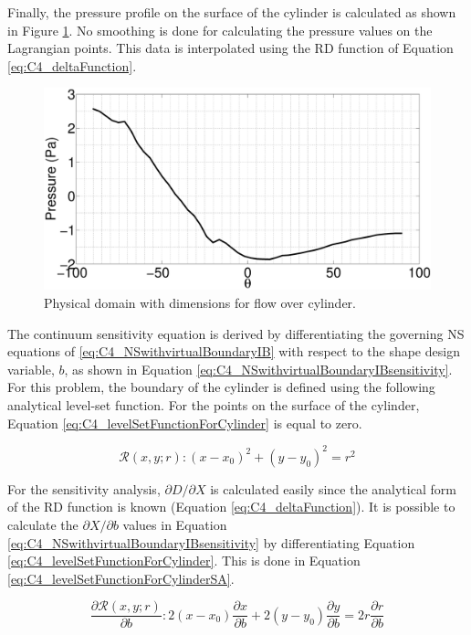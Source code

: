 Finally, the pressure profile on the surface of the cylinder is calculated as shown in Figure \ref{fig:C4_pressureOnSurfaceCylinder}. No smoothing is done for calculating the pressure values on the Lagrangian points. This data is interpolated using the RD function of Equation \eqref{eq:C4_deltaFunction}.

\begin{figure}[H]
    \centering
    \includegraphics[width=12.00cm]{Chapter_4/figure/flow_over_cylinder/p_on_boundary_RE100.eps}
    \caption{Physical domain with dimensions for flow over cylinder.}
    \label{fig:C4_pressureOnSurfaceCylinder}
\end{figure}

The continuum sensitivity equation is derived by differentiating the governing NS equations of \eqref{eq:C4_NSwithvirtualBoundaryIB} with respect to the shape design variable, $b$, as shown in Equation \eqref{eq:C4_NSwithvirtualBoundaryIBsensitivity}. For this problem, the boundary of the cylinder is defined using the following analytical level-set function. For the points on the surface of the cylinder, Equation \eqref{eq:C4_levelSetFunctionForCylinder} is equal to zero.

\begin{equation}\label{eq:C4_levelSetFunctionForCylinder}
	\mathcal{R}(x, y; r): (x - x_0)^2 + (y - y_0)^2 = r^2
\end{equation}

For the sensitivity analysis, $\partial D/\partial X$ is calculated easily since the analytical form of the RD function is known (Equation \eqref{eq:C4_deltaFunction}). It is possible to calculate the $\partial X/\partial b$ values in Equation \eqref{eq:C4_NSwithvirtualBoundaryIBsensitivity} by differentiating Equation \eqref{eq:C4_levelSetFunctionForCylinder}. This is done in Equation \eqref{eq:C4_levelSetFunctionForCylinderSA}.

\begin{equation}\label{eq:C4_levelSetFunctionForCylinderSA}
	\frac{\partial \mathcal{R}(x, y; r)}{\partial b}: 
	2 (x - x_0)\dfrac{\partial x}{\partial b} + 
	2 (y - y_0)\frac{\partial y}{\partial b} = 
	2 r \frac{\partial r}{\partial b}
\end{equation}

